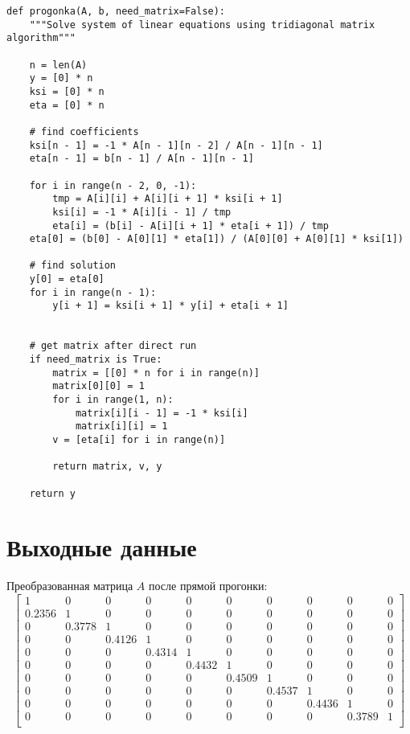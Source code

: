 \documentclass[12pt]{report}
\begin{document}
\begin{lstlisting}
def progonka(A, b, need_matrix=False):
	"""Solve system of linear equations using tridiagonal matrix algorithm"""

	n = len(A)
	y = [0] * n
	ksi = [0] * n
	eta = [0] * n

	# find coefficients
	ksi[n - 1] = -1 * A[n - 1][n - 2] / A[n - 1][n - 1]
	eta[n - 1] = b[n - 1] / A[n - 1][n - 1]

	for i in range(n - 2, 0, -1):
		tmp = A[i][i] + A[i][i + 1] * ksi[i + 1]
		ksi[i] = -1 * A[i][i - 1] / tmp
		eta[i] = (b[i] - A[i][i + 1] * eta[i + 1]) / tmp
	eta[0] = (b[0] - A[0][1] * eta[1]) / (A[0][0] + A[0][1] * ksi[1])

	# find solution
	y[0] = eta[0]
	for i in range(n - 1):
		y[i + 1] = ksi[i + 1] * y[i] + eta[i + 1]


	# get matrix after direct run
	if need_matrix is True:
		matrix = [[0] * n for i in range(n)]
		matrix[0][0] = 1
		for i in range(1, n):
			matrix[i][i - 1] = -1 * ksi[i]
			matrix[i][i] = 1
		v = [eta[i] for i in range(n)]

		return matrix, v, y

	return y

\end{lstlisting}

\section{Выходные данные}

Преобразованная матрица $A$ после прямой прогонки: 
\[
\begin{bmatrix}
     1 & 0 & 0 & 0 & 0 & 0 & 0 & 0 & 0 & 0 \\
     0.2356 & 1 & 0 & 0 & 0 & 0 & 0 & 0 & 0 & 0 \\
     0 & 0.3778 & 1 & 0 & 0 & 0 & 0 & 0 & 0 & 0 \\
     0 & 0 & 0.4126 & 1 & 0 & 0 & 0 & 0 & 0 & 0 \\
     0 & 0 & 0 & 0.4314 & 1 & 0 & 0 & 0 & 0 & 0 \\
     0 & 0 & 0 & 0 & 0.4432 & 1 & 0 & 0 & 0 & 0 \\
     0 & 0 & 0 & 0 & 0 & 0.4509 & 1 & 0 & 0 & 0 \\
     0 & 0 & 0 & 0 & 0 & 0 & 0.4537 & 1 & 0 & 0 \\
     0 & 0 & 0 & 0 & 0 & 0 & 0 & 0.4436 & 1 & 0 \\
     0 & 0 & 0 & 0 & 0 & 0 & 0 & 0 & 0.3789 & 1 \\
\end{bmatrix}
\]
\end{document}
